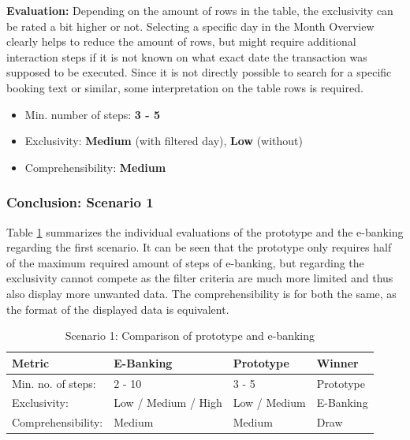 \textbf{Evaluation:} Depending on the amount of rows in the table, the exclusivity can be rated a bit higher or not. Selecting a specific day in the Month Overview clearly helps to reduce the amount of rows, but might require additional interaction steps if it is not known on what exact date the transaction was supposed to be executed. Since it is not directly possible to search for a specific booking text or similar, some interpretation on the table rows is required.
\begin{itemize}[noitemsep,nolistsep]
	\item Min. number of steps: \textbf{3 - 5}
	\item Exclusivity: \textbf{Medium} (with filtered day), \textbf{Low} (without)
	\item Comprehensibility: \textbf{Medium}
\end{itemize}



\subsubsection{Conclusion: Scenario 1}

Table \ref{tbl:scenarioonecomparison} summarizes the individual evaluations of the prototype and the e-banking regarding the first scenario. It can be seen that the prototype only requires half of the maximum required amount of steps of e-banking, but regarding the exclusivity cannot compete as the filter criteria are much more limited and thus also display more unwanted data. The comprehensibility is for both the same, as the format of the displayed data is equivalent.
\begin{table}[h]
	\begin{center}
		\begin{tabular}{ | p{3.2cm} | p{3.8cm} | p{3.5cm} | p{2.5cm} | }
			\hline
			\textbf{Metric} & \textbf{E-Banking} & \textbf{Prototype} & \textbf{Winner} \\
			\hline
				Min. no. of steps: & 2 - 10 & 3 - 5 & Prototype \\
			\hline
				Exclusivity: & Low / Medium / High & Low / Medium & E-Banking \\
			\hline
				Comprehensibility: & Medium & Medium & Draw \\
			\hline
		\end{tabular}
		\caption{Scenario 1: Comparison of prototype and e-banking}
		\label{tbl:scenarioonecomparison}
	\end{center}
\end{table}


